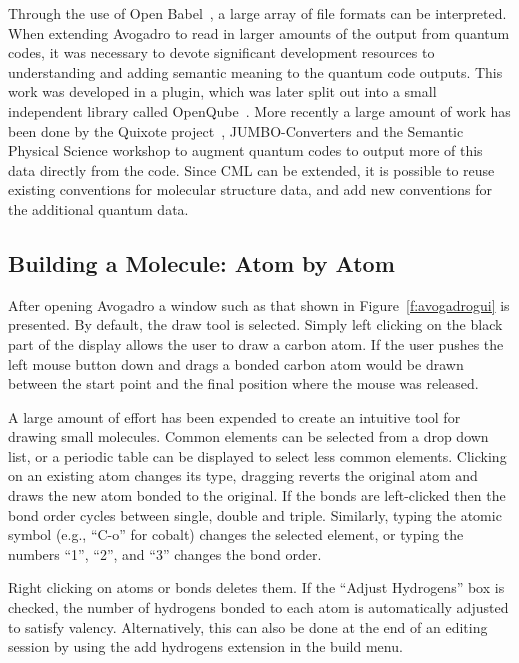 \documentclass[10pt]{bmc_article}
\newenvironment{bmcformat}{\begin{raggedright}
\baselineskip20pt\sloppy\setboolean{publ}{false}}{\end{raggedright}
\baselineskip20pt\sloppy}
\begin{document}
\begin{bmcformat}
Through the use of Open Babel~\cite{OpenBabel}, a large array of file
formats can be interpreted. When extending Avogadro to read in larger
amounts of the output from quantum codes, it was necessary to devote
significant development resources to understanding and adding semantic
meaning to the quantum code outputs. This work was developed in a plugin, which was later split out into a small independent
library called OpenQube~\cite{OpenQube}\cite{OpenQubeSource}. More recently a large amount of work has been done
by the Quixote project~\cite{Quixote}, JUMBO-Converters and the Semantic
Physical Science workshop to augment quantum codes to output more of this data
directly from the code. Since CML can be extended, it is possible to reuse
existing conventions for molecular structure data, and add new
conventions for the additional quantum data.

\subsection{Building a Molecule: Atom by Atom}

After opening Avogadro a window such as that shown in Figure~\ref{f:avogadrogui}
is presented. By default, the draw tool is selected. Simply left clicking on the
black part of the display
allows the user to draw a carbon atom. If the user pushes the left
mouse button down and drags a bonded carbon atom would be drawn
between the start point and the final position where the mouse was released.

A large amount of effort has been expended to create an intuitive tool for
drawing small molecules. Common elements can be selected from a drop down list,
or a periodic table can be displayed to select less common elements. Clicking on
an existing atom changes its type, dragging reverts the original atom and draws
the new atom bonded to the original. If the bonds are left-clicked then the bond
order cycles between single, double and triple. Similarly, typing the
atomic symbol (e.g., ``C-o'' for cobalt) changes the selected element,
or typing the numbers ``1'', ``2'', and ``3'' changes the bond order.

Right clicking on atoms or bonds deletes them. If the ``Adjust Hydrogens'' box
is checked, the number of hydrogens bonded to each atom is automatically
adjusted to satisfy valency. Alternatively, this can also be done at the end of
an editing session by using the add hydrogens extension in the build menu.


\end{bmcformat}
\end{document}
